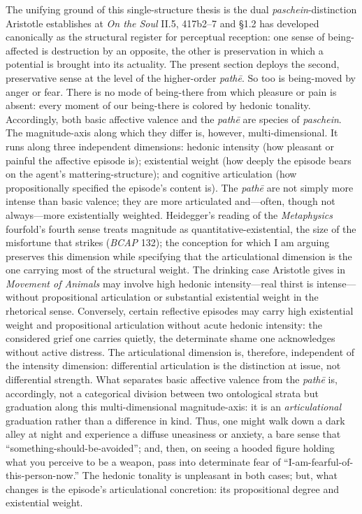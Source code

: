 \documentclass{article}
\begin{document}
The unifying ground of this single-structure thesis is the dual \textit{paschein}-distinction Aristotle establishes at \textit{On the Soul} II.5, 417b2--7 and \S1.2 has developed canonically as the structural register for perceptual reception: one sense of being-affected is destruction by an opposite, the other is preservation in which a potential is brought into its actuality. The present section deploys the second, preservative sense at the level of the higher-order \textit{pathē}. So too is being-moved by anger or fear. There is no mode of being-there from which pleasure or pain is absent: every moment of our being-there is colored by hedonic tonality. Accordingly, both basic affective valence and the \textit{pathē} are species of \textit{paschein}. The magnitude-axis along which they differ is, however, multi-dimensional. It runs along three independent dimensions: hedonic intensity (how pleasant or painful the affective episode is); existential weight (how deeply the episode bears on the agent's mattering-structure); and cognitive articulation (how propositionally specified the episode's content is). The \textit{pathē} are not simply more intense than basic valence; they are more articulated and---often, though not always---more existentially weighted. Heidegger's reading of the \textit{Metaphysics} fourfold's fourth sense treats magnitude as quantitative-existential, the size of the misfortune that strikes (\textit{BCAP} 132); the conception for which I am arguing preserves this dimension while specifying that the articulational dimension is the one carrying most of the structural weight. The drinking case Aristotle gives in \textit{Movement of Animals} may involve high hedonic intensity---real thirst is intense---without propositional articulation or substantial existential weight in the rhetorical sense. Conversely, certain reflective episodes may carry high existential weight and propositional articulation without acute hedonic intensity: the considered grief one carries quietly, the determinate shame one acknowledges without active distress. The articulational dimension is, therefore, independent of the intensity dimension: differential articulation is the distinction at issue, not differential strength. What separates basic affective valence from the \textit{pathē} is, accordingly, not a categorical division between two ontological strata but graduation along this multi-dimensional magnitude-axis: it is an \textit{articulational} graduation rather than a difference in kind. Thus, one might walk down a dark alley at night and experience a diffuse uneasiness or anxiety, a bare sense that ``something-should-be-avoided''; and, then, on seeing a hooded figure holding what you perceive to be a weapon, pass into determinate fear of ``I-am-fearful-of-this-person-now.'' The hedonic tonality is unpleasant in both cases; but, what changes is the episode's articulational concretion: its propositional degree and existential weight. 
\end{document}
